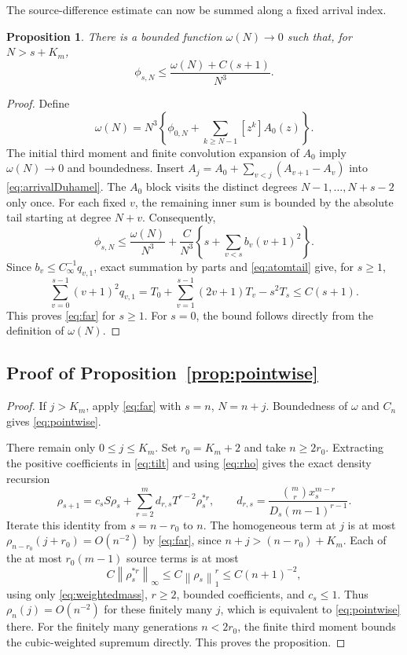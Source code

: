 \documentclass[11pt,letterpaper,reqno]{amsart}
\theoremstyle{plain}
\newtheorem{proposition}[theorem]{Proposition}
\newcommand{\norm}[1]{\left\lVert#1\right\rVert}
\begin{document}
The source-difference estimate can now be summed along a fixed arrival index.
\begin{proposition}\label{prop:far}
There is a bounded function $\omega(N)\to0$ such that, for $N>s+K_m$,
\begin{equation}\label{eq:far}
 \phi_{s,N}\le\frac{\omega(N)+C(s+1)}{N^3}.
\end{equation}
\end{proposition}
\begin{proof}
Define
\[
 \omega(N)=N^3\left\{\phi_{0,N}+\sum_{k\ge N-1}[z^k]A_0(z)\right\}.
\]
The initial third moment and finite convolution expansion of $A_0$ imply $\omega(N)\to0$ and boundedness. Insert $A_j=A_0+\sum_{v<j}(A_{v+1}-A_v)$ into \eqref{eq:arrivalDuhamel}. The $A_0$ block visits the distinct degrees $N-1,\ldots,N+s-2$ only once. For each fixed $v$, the remaining inner sum is bounded by the absolute tail starting at degree $N+v$. Consequently,
\[
 \phi_{s,N}\le\frac{\omega(N)}{N^3}
 +\frac C{N^3}\left\{s+\sum_{v<s}b_v(v+1)^2\right\}.
\]
Since $b_v\le C_\infty^{-1}q_{v,1}$, exact summation by parts and \eqref{eq:atomtail} give, for $s\ge1$,
\[
 \sum_{v=0}^{s-1}(v+1)^2q_{v,1}
 =T_0+\sum_{v=1}^{s-1}(2v+1)T_v-s^2T_s\le C(s+1).
\]
This proves \eqref{eq:far} for $s\ge1$. For $s=0$, the bound follows directly from the definition of $\omega(N)$.
\end{proof}

\subsection{Proof of Proposition~\ref{prop:pointwise}}
\begin{proof}
If $j>K_m$, apply \eqref{eq:far} with $s=n$, $N=n+j$. Boundedness of $\omega$ and $C_n$ gives \eqref{eq:pointwise}.

There remain only $0\le j\le K_m$. Set $r_0=K_m+2$ and take $n\ge2r_0$. Extracting the positive coefficients in \eqref{eq:tilt} and using \eqref{eq:rho} gives the exact density recursion
\begin{equation}\label{eq:rhor}
 \rho_{s+1}=c_sS\rho_s+\sum_{r=2}^m d_{r,s}T^{r-2}\rho_s^{*r},\qquad
 d_{r,s}=\frac{\binom mr x_s^{m-r}}{D_s(m-1)^{r-1}}.
\end{equation}
Iterate this identity from $s=n-r_0$ to $n$. The homogeneous term at $j$ is at most $\rho_{n-r_0}(j+r_0)=O(n^{-2})$ by \eqref{eq:far}, since $n+j>(n-r_0)+K_m$. Each of the at most $r_0(m-1)$ source terms is at most
\[
 C\norm{\rho_s^{*r}}_\infty\le C\norm{\rho_s}_1^r\le C(n+1)^{-2},
\]
using only \eqref{eq:weightedmass}, $r\ge2$, bounded coefficients, and $c_s\le1$. Thus $\rho_n(j)=O(n^{-2})$ for these finitely many $j$, which is equivalent to \eqref{eq:pointwise} there. For the finitely many generations $n<2r_0$, the finite third moment bounds the cubic-weighted supremum directly. This proves the proposition.
\end{proof}
\end{document}

